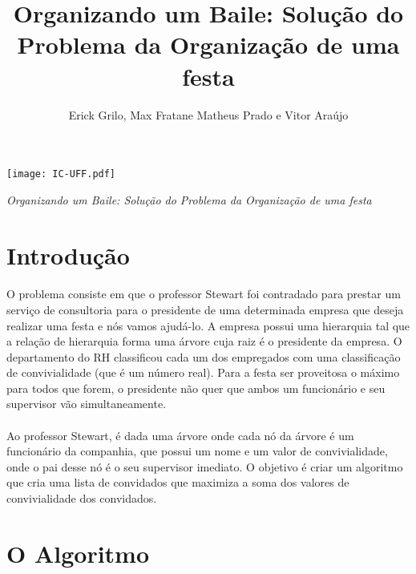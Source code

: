 \documentclass[a4paper]{article}
\title{Organizando um Baile: Solução do Problema da Organização de uma festa}
\author{Erick Grilo, Max Fratane   Matheus Prado e Vitor Araújo}
\begin{document}
\begin{flushright}
\thispagestyle{empty}
\texttt{[image: IC-UFF.pdf]}
\end{flushright}

\begin{center}
\vfill
\vspace{-7em}
\emph{\Large Organizando um Baile: Solução do Problema da Organização de uma festa}
\begin{flushright}
\vspace{1em}
\end{flushright}
\vfill
\end{center}

\newpage

\section{Introdução}
\paragraph{} O problema consiste em que o professor Stewart foi contradado para prestar um serviço de consultoria para o presidente de uma determinada empresa que deseja realizar uma festa e nós vamos ajudá-lo. A empresa possui uma hierarquia tal que a relação de hierarquia forma uma árvore 
cuja raiz é o presidente da empresa. O departamento do RH classificou cada um dos empregados com uma classificação de convivialidade (que é um número real). Para a festa ser proveitosa o máximo para todos que forem, o presidente não quer que ambos um funcionário e seu supervisor vão simultaneamente.
\paragraph{} Ao professor Stewart, é dada uma árvore
onde cada nó da árvore é um funcionário da companhia, que possui um nome e um valor de convivialidade, onde o pai desse nó é o seu supervisor imediato. O objetivo é criar um algoritmo que cria uma lista de convidados que maximiza a soma dos valores de convivialidade dos convidados.

\section{O Algoritmo}\label{sec:rec}
\end{document}
